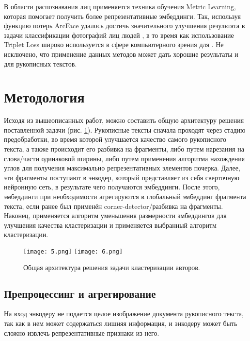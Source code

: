     В области распознавания лиц применяется техника обучения Metric Learning, которая помогает получить более репрезентативные эмбеддинги. Так, используя функцию потерь ArcFace удалось достичь значительного улучшения результата в задачи классификации фотографий лиц людей \cite{arcface}, в то время как использование Triplet Loss широко используется в сфере компьютерного зрения для \cite{triplet_loss} \cite{netvlad}. Не исключено, что применение данных методов может дать хорошие результаты и для рукописных текстов.
    
\newpage
\section{Методология}

    Исходя из вышеописанных работ, можно составить общую архитектуру решения поставленной задачи (рис. \ref{fig:general}). Рукописные тексты сначала проходят через стадию предобработки, во время которой улучшается качество самого рукописного текста, а также происходит его разбивка на фрагменты, либо путем нарезания на слова/части одинаковой ширины, либо путем применения алгоритма нахождения углов для получения максимально репрезентативных элементов почерка.
    Далее, эти фрагменты поступают в энкодер, который представляет из себя сверточную нейронную сеть, в результате чего получаются эмбеддинги. После этого, эмбеддинги при необходимости агрегируются в глобальный эмбеддинг фрагмента текста, если ранее был применён corner-detector/разбивка на фрагменты. Наконец, применяется алгоритм уменьшения размерности эмбеддингов для улучшения качества кластеризации и применяется выбранный алгоритм кластеризации.

    \begin{figure}[htbp]
        \centering
        \texttt{[image: 5.png]}
        \texttt{[image: 6.png]}
        \caption{Общая архитектура решения задачи кластеризации авторов.}
        \label{fig:general}
    \end{figure}

\subsection{Препроцессинг и агрегирование}

    На вход энкодеру не подается целое изображение документа рукописного текста, так как в нем может содержаться лишняя информация, и энкодеру может быть сложно извлечь репрезентативные признаки из него.

